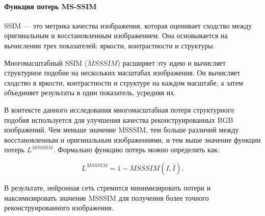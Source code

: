\paragraph{Функция потерь MS-SSIM}

SSIM — это метрика качества изображения, которая оценивает сходство между оригинальным и восстановленным изображением. Она основывается на вычислении трех показателей: яркости, контрастности и структуры.

Многомасштабный SSIM ($MSSSIM$) расширяет эту идею и вычисляет структурное подобие на нескольких масштабах изображения. Он вычисляет сходство в яркости, контрастности и структуре на каждом масштабе, а затем объединяет результаты в один показатель, усредняя их.

В контексте данного исследования многомасштабная потеря структурного подобия используется для улучшения качества реконструированных RGB изображений. Чем меньше значение MSSSIM, тем больше различий между восстановленным и оригинальным изображениями, и тем выше значение функции потерь $L^{MSSSIM}$. Формально функцию потерь можно определить как:

\begin{equation}
    \label{eq:2-1-3-3}
    L^{MSSSIM} = 1 - MSSSIM(I, \hat{I}).
\end{equation}

В результате, нейронная сеть стремится минимизировать потери и максимизировать значение MSSSIM для получения более точного реконструированного изображения.